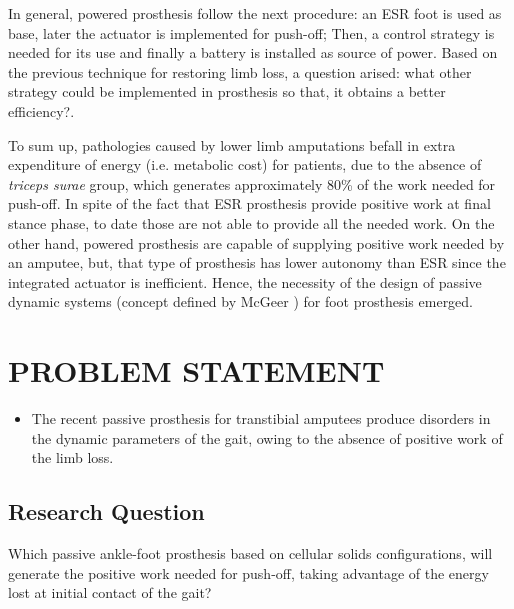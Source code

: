 \documentclass[12pt,english]{article}
\begin{document}
In general, powered prosthesis follow the next procedure: an ESR foot is used as base, later the actuator is implemented for push-off; Then, a control strategy is needed for its use and finally a battery is installed as source of power. Based on the previous technique for restoring limb loss, a question arised: what other strategy could be implemented in prosthesis so that, it obtains a better efficiency?.  

To sum up, pathologies caused by lower limb amputations befall in extra expenditure of energy (i.e. metabolic cost) for patients, due to the absence of \emph{triceps surae} group, which generates approximately 80\% of the work needed for push-off. In spite of the fact that ESR prosthesis provide positive work at final stance phase, to date those are not able to provide all the needed work. On the other hand, powered prosthesis are capable of supplying positive work needed by an amputee, but, that type of prosthesis has lower autonomy than ESR since the integrated actuator is inefficient. Hence, the necessity of the design of passive dynamic systems (concept defined by McGeer \cite{mcgeer1990passive}) for foot prosthesis emerged. 





\section{PROBLEM STATEMENT}
\begin{itemize}
\item The recent passive prosthesis for transtibial amputees produce disorders in the dynamic parameters of the gait, owing to the absence of positive work of the limb loss. 
\end{itemize}

\subsection{Research Question}

Which passive ankle-foot prosthesis based on cellular solids configurations, will generate the positive work needed for push-off, taking advantage of the energy lost at initial contact of the gait?
\end{document}
